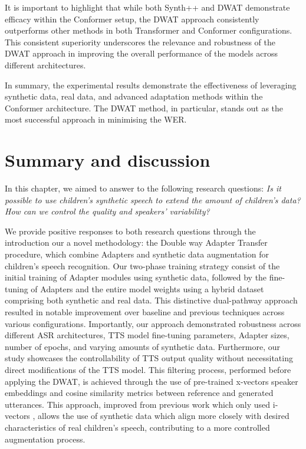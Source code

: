 It is important to highlight that while both Synth++ and DWAT demonstrate efficacy within the Conformer setup, the DWAT approach consistently outperforms other methods in both Transformer and Conformer configurations. This consistent superiority underscores the relevance and robustness of the DWAT approach in improving the overall performance of the models across different architectures.

In summary, the experimental results demonstrate the effectiveness of leveraging synthetic data, real data, and advanced adaptation methods within the Conformer architecture. The DWAT method, in particular, stands out as the most successful approach in minimising the WER.


\section{Summary and discussion}
\label{section:conclusions_tts}

In this chapter, we aimed to answer to the following research questions: \textit{Is it possible to use children's synthetic speech to extend the amount of children's data? How can we control the quality and speakers’ variability?}

We provide positive responses to both research questions through the introduction our a novel methodology: the Double way Adapter Transfer procedure, which combine Adapters and synthetic data augmentation for children's speech recognition. Our two-phase training strategy consist of the initial training of Adapter modules using synthetic data, followed by the fine-tuning of Adapters and the entire model weights using a hybrid dataset comprising both synthetic and real data. This distinctive dual-pathway approach resulted in notable improvement over baseline and previous techniques across various configurations. Importantly, our approach demonstrated robustness across different ASR architectures, TTS model fine-tuning parameters, Adapter sizes, number of epochs, and varying amounts of synthetic data. Furthermore, our study showcases the controllability of TTS output quality without necessitating direct modifications of the TTS model. This filtering process, performed before applying the DWAT, is achieved through the use of pre-trained x-vectors speaker embeddings and cosine similarity metrics between reference and generated utterances. This approach, improved from previous work which only used i-vectors \cite{wang2021towards}, allows the use of synthetic data which align more closely with desired characteristics of real children's speech, contributing to a more controlled augmentation process.

